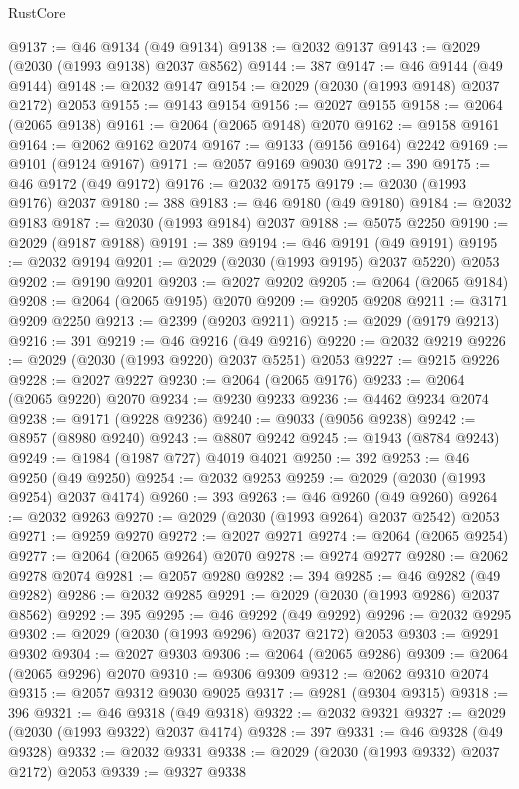 \begin{lexlean}{RustCore}
\begin{coremodule}
@9137 := @46 @9134 (@49 @9134)
@9138 := @2032 @9137
@9143 := @2029 (@2030 (@1993 @9138) @2037 @8562)
@9144 := 387
@9147 := @46 @9144 (@49 @9144)
@9148 := @2032 @9147
@9154 := @2029 (@2030 (@1993 @9148) @2037 @2172) @2053
@9155 := @9143 @9154
@9156 := @2027 @9155
@9158 := @2064 (@2065 @9138)
@9161 := @2064 (@2065 @9148) @2070
@9162 := @9158 @9161
@9164 := @2062 @9162 @2074
@9167 := @9133 (@9156 @9164) @2242
@9169 := @9101 (@9124 @9167)
@9171 := @2057 @9169 @9030
@9172 := 390
@9175 := @46 @9172 (@49 @9172)
@9176 := @2032 @9175
@9179 := @2030 (@1993 @9176) @2037
@9180 := 388
@9183 := @46 @9180 (@49 @9180)
@9184 := @2032 @9183
@9187 := @2030 (@1993 @9184) @2037
@9188 := @5075 @2250
@9190 := @2029 (@9187 @9188)
@9191 := 389
@9194 := @46 @9191 (@49 @9191)
@9195 := @2032 @9194
@9201 := @2029 (@2030 (@1993 @9195) @2037 @5220) @2053
@9202 := @9190 @9201
@9203 := @2027 @9202
@9205 := @2064 (@2065 @9184)
@9208 := @2064 (@2065 @9195) @2070
@9209 := @9205 @9208
@9211 := @3171 @9209 @2250
@9213 := @2399 (@9203 @9211)
@9215 := @2029 (@9179 @9213)
@9216 := 391
@9219 := @46 @9216 (@49 @9216)
@9220 := @2032 @9219
@9226 := @2029 (@2030 (@1993 @9220) @2037 @5251) @2053
@9227 := @9215 @9226
@9228 := @2027 @9227
@9230 := @2064 (@2065 @9176)
@9233 := @2064 (@2065 @9220) @2070
@9234 := @9230 @9233
@9236 := @4462 @9234 @2074
@9238 := @9171 (@9228 @9236)
@9240 := @9033 (@9056 @9238)
@9242 := @8957 (@8980 @9240)
@9243 := @8807 @9242
@9245 := @1943 (@8784 @9243)
@9249 := @1984 (@1987 @727) @4019 @4021
@9250 := 392
@9253 := @46 @9250 (@49 @9250)
@9254 := @2032 @9253
@9259 := @2029 (@2030 (@1993 @9254) @2037 @4174)
@9260 := 393
@9263 := @46 @9260 (@49 @9260)
@9264 := @2032 @9263
@9270 := @2029 (@2030 (@1993 @9264) @2037 @2542) @2053
@9271 := @9259 @9270
@9272 := @2027 @9271
@9274 := @2064 (@2065 @9254)
@9277 := @2064 (@2065 @9264) @2070
@9278 := @9274 @9277
@9280 := @2062 @9278 @2074
@9281 := @2057 @9280
@9282 := 394
@9285 := @46 @9282 (@49 @9282)
@9286 := @2032 @9285
@9291 := @2029 (@2030 (@1993 @9286) @2037 @8562)
@9292 := 395
@9295 := @46 @9292 (@49 @9292)
@9296 := @2032 @9295
@9302 := @2029 (@2030 (@1993 @9296) @2037 @2172) @2053
@9303 := @9291 @9302
@9304 := @2027 @9303
@9306 := @2064 (@2065 @9286)
@9309 := @2064 (@2065 @9296) @2070
@9310 := @9306 @9309
@9312 := @2062 @9310 @2074
@9315 := @2057 @9312 @9030 @9025
@9317 := @9281 (@9304 @9315)
@9318 := 396
@9321 := @46 @9318 (@49 @9318)
@9322 := @2032 @9321
@9327 := @2029 (@2030 (@1993 @9322) @2037 @4174)
@9328 := 397
@9331 := @46 @9328 (@49 @9328)
@9332 := @2032 @9331
@9338 := @2029 (@2030 (@1993 @9332) @2037 @2172) @2053
@9339 := @9327 @9338

\end{coremodule}
\end{lexlean}

